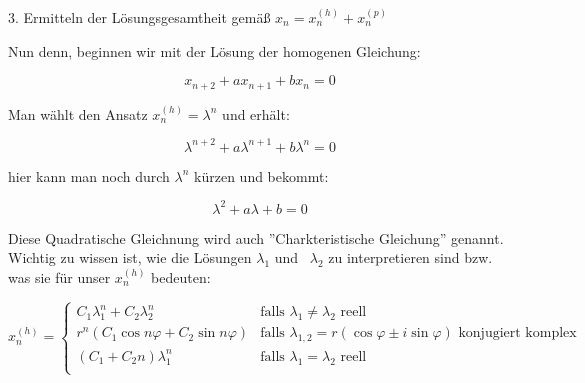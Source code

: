 \begin{uebsp}
\begin{Answer}
{
3. Ermitteln der L\"osungsgesamtheit gem\"a{\ss} 
$x_{n}=x_{n}^{(h)}+x_{n}^{(p)}$ }



{
Nun denn, beginnen wir mit der L\"osung der homogenen Gleichung:}



\begin{equation*}
x_{n+2}+\mathit{ax}_{n+1}+\mathit{bx}_{n}=0
\end{equation*}


{
Man w\"ahlt den Ansatz  $x_{n}^{(h)}=\lambda ^{n}$  und erh\"alt:}



\begin{equation*}
\lambda ^{n+2}+a\lambda ^{n+1}+b\lambda ^{n}=0
\end{equation*}


{
hier kann man noch durch  $\lambda ^{n}$ k\"urzen und bekommt:}



\begin{equation*}
\lambda ^{2}+a\lambda +b=0
\end{equation*}


{
Diese Quadratische Gleichnung wird auch ''Charkteristische
Gleichung'' genannt. Wichtig zu wissen ist, wie die
L\"osungen  $\lambda _{1}$ und \  $\lambda _{2}$ zu interpretieren sind
bzw. was sie f\"ur unser  $x_{n}^{(h)}$ bedeuten: }







    \[
        x_n^{(h)} = \begin{cases} 
                C_1\lambda_1^n+C_2\lambda_2^n &\mbox{falls } \lambda_1 \neq \lambda_2 \mbox{ reell} \\
                r^n(C_1\cos n\varphi+C_2\sin n\varphi) &\mbox{falls } \lambda_{1,2} = r(\cos\varphi\pm i\sin\varphi)\mbox{ konjugiert komplex} \\
                (C_1+C_2n)\lambda_1^n &\mbox{falls } \lambda_1 = \lambda_2 \mbox{ reell} \\
            \end{cases}
    \]


\end{Answer}
\end{uebsp}
